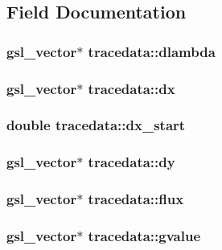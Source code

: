 \subsection{Field Documentation}
\hypertarget{structtracedata_a63bce5a9b367504eb09b87f41f3373da}{
\subsubsection[{dlambda}]{\setlength{\rightskip}{0pt plus 5cm}gsl\_\-vector$\ast$ {\bf tracedata::dlambda}}}
\label{structtracedata_a63bce5a9b367504eb09b87f41f3373da}
\hypertarget{structtracedata_aebca3378cacc91654b164c7818f120e2}{
\subsubsection[{dx}]{\setlength{\rightskip}{0pt plus 5cm}gsl\_\-vector$\ast$ {\bf tracedata::dx}}}
\label{structtracedata_aebca3378cacc91654b164c7818f120e2}
\hypertarget{structtracedata_a30448278ba94615e1ef5d8801deab6e6}{
\subsubsection[{dx\_\-start}]{\setlength{\rightskip}{0pt plus 5cm}double {\bf tracedata::dx\_\-start}}}
\label{structtracedata_a30448278ba94615e1ef5d8801deab6e6}
\hypertarget{structtracedata_a0bdd805ca59eb0b1329694181236c191}{
\subsubsection[{dy}]{\setlength{\rightskip}{0pt plus 5cm}gsl\_\-vector$\ast$ {\bf tracedata::dy}}}
\label{structtracedata_a0bdd805ca59eb0b1329694181236c191}
\hypertarget{structtracedata_a536ca0eb0a785814fc211bcf835f666a}{
\subsubsection[{flux}]{\setlength{\rightskip}{0pt plus 5cm}gsl\_\-vector$\ast$ {\bf tracedata::flux}}}
\label{structtracedata_a536ca0eb0a785814fc211bcf835f666a}
\hypertarget{structtracedata_a263d2f1a51308e73d79c77f5e62c01fb}{
\subsubsection[{gvalue}]{\setlength{\rightskip}{0pt plus 5cm}gsl\_\-vector$\ast$ {\bf tracedata::gvalue}}}
